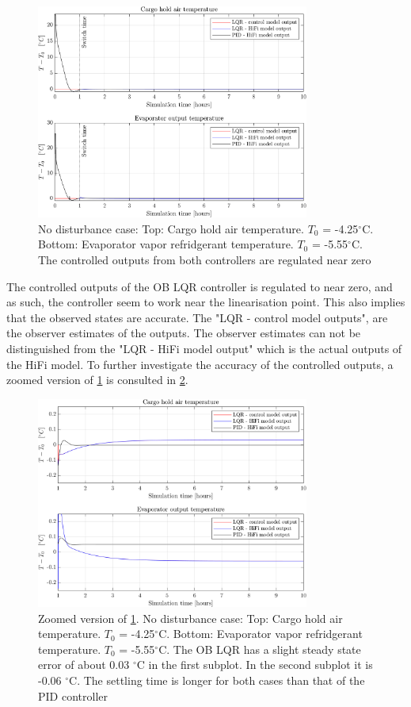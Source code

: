 \begin{figure}[H]
	\centering
	\includegraphics[width=0.8\textwidth]{Graphics/fig_LQRvsKresten_noDist.png}
	\caption{No disturbance case: Top: Cargo hold air temperature. $T_0$ = -4.25$^{\circ}$C. Bottom: Evaporator vapor refridgerant temperature. $T_0$ = -5.55$^{\circ}$C. The controlled outputs from both controllers are regulated near zero}
	\label{fig:LQR_wellTuned_noDist}
\end{figure} 
The controlled outputs of the OB LQR controller is regulated to near zero, and as such, the controller seem to work near the linearisation point. This also implies that the observed states are accurate. The "LQR - control model outputs", are the observer estimates of the outputs. The observer estimates can not be distinguished from the "LQR - HiFi model output" which is the actual outputs of the HiFi model. To further investigate the accuracy of the controlled outputs, a zoomed version of \cref{fig:LQR_wellTuned_noDist} is consulted in \cref{fig:LQR_wellTuned_noDist_zoom}.


\begin{figure}[H]
	\centering
	\includegraphics[width=0.8\textwidth]{Graphics/fig_LQRvsKresten_noDist_zoom.png}
	\caption{Zoomed version of \cref{fig:LQR_wellTuned_noDist}. No disturbance case: Top: Cargo hold air temperature. $T_0$ = -4.25$^{\circ}$C. Bottom: Evaporator vapor refridgerant temperature. $T_0$ = -5.55$^{\circ}$C. The OB LQR has a slight steady state error of about 0.03 $^{\circ}$C in the first subplot. In the second subplot it is -0.06 $^{\circ}$C. The settling time is longer for both cases than that of the PID controller}
	\label{fig:LQR_wellTuned_noDist_zoom}
\end{figure}

